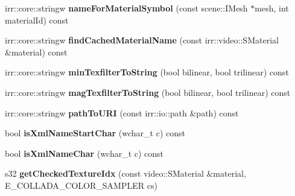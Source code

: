 \begin{DoxyCompactItemize}
\item 
\hypertarget{classirr_1_1scene_1_1_c_collada_mesh_writer_a8a602cbf1770a274ef5d2f45afbde319}{irr\-::core\-::stringw {\bfseries name\-For\-Material\-Symbol} (const scene\-::\-I\-Mesh $\ast$mesh, int material\-Id) const }\label{classirr_1_1scene_1_1_c_collada_mesh_writer_a8a602cbf1770a274ef5d2f45afbde319}

\item 
\hypertarget{classirr_1_1scene_1_1_c_collada_mesh_writer_af6b5bf14dbd4b26cb6942a47a8d84a33}{irr\-::core\-::stringw {\bfseries find\-Cached\-Material\-Name} (const irr\-::video\-::\-S\-Material \&material) const }\label{classirr_1_1scene_1_1_c_collada_mesh_writer_af6b5bf14dbd4b26cb6942a47a8d84a33}

\item 
\hypertarget{classirr_1_1scene_1_1_c_collada_mesh_writer_a549248b878dd96e192d00bddd26a880c}{irr\-::core\-::stringw {\bfseries min\-Texfilter\-To\-String} (bool bilinear, bool trilinear) const }\label{classirr_1_1scene_1_1_c_collada_mesh_writer_a549248b878dd96e192d00bddd26a880c}

\item 
\hypertarget{classirr_1_1scene_1_1_c_collada_mesh_writer_aa00e195b4d3e20b9d9d4dfcb2fba3723}{irr\-::core\-::stringw {\bfseries mag\-Texfilter\-To\-String} (bool bilinear, bool trilinear) const }\label{classirr_1_1scene_1_1_c_collada_mesh_writer_aa00e195b4d3e20b9d9d4dfcb2fba3723}

\item 
\hypertarget{classirr_1_1scene_1_1_c_collada_mesh_writer_a0a574df6c8ff1ab43055537a610b9df1}{irr\-::core\-::stringw {\bfseries path\-To\-U\-R\-I} (const irr\-::io\-::path \&path) const }\label{classirr_1_1scene_1_1_c_collada_mesh_writer_a0a574df6c8ff1ab43055537a610b9df1}

\item 
\hypertarget{classirr_1_1scene_1_1_c_collada_mesh_writer_aa68abcf9cfb90c1fcaa3c9f773625da0}{bool {\bfseries is\-Xml\-Name\-Start\-Char} (wchar\-\_\-t c) const }\label{classirr_1_1scene_1_1_c_collada_mesh_writer_aa68abcf9cfb90c1fcaa3c9f773625da0}

\item 
\hypertarget{classirr_1_1scene_1_1_c_collada_mesh_writer_ac90853356e950f16a12f2a3ce2436a99}{bool {\bfseries is\-Xml\-Name\-Char} (wchar\-\_\-t c) const }\label{classirr_1_1scene_1_1_c_collada_mesh_writer_ac90853356e950f16a12f2a3ce2436a99}

\item 
\hypertarget{classirr_1_1scene_1_1_c_collada_mesh_writer_aa48e2bf6c680764b841cde30a5e32d8b}{s32 {\bfseries get\-Checked\-Texture\-Idx} (const video\-::\-S\-Material \&material, E\-\_\-\-C\-O\-L\-L\-A\-D\-A\-\_\-\-C\-O\-L\-O\-R\-\_\-\-S\-A\-M\-P\-L\-E\-R cs)}\label{classirr_1_1scene_1_1_c_collada_mesh_writer_aa48e2bf6c680764b841cde30a5e32d8b}


\end{DoxyCompactItemize}
